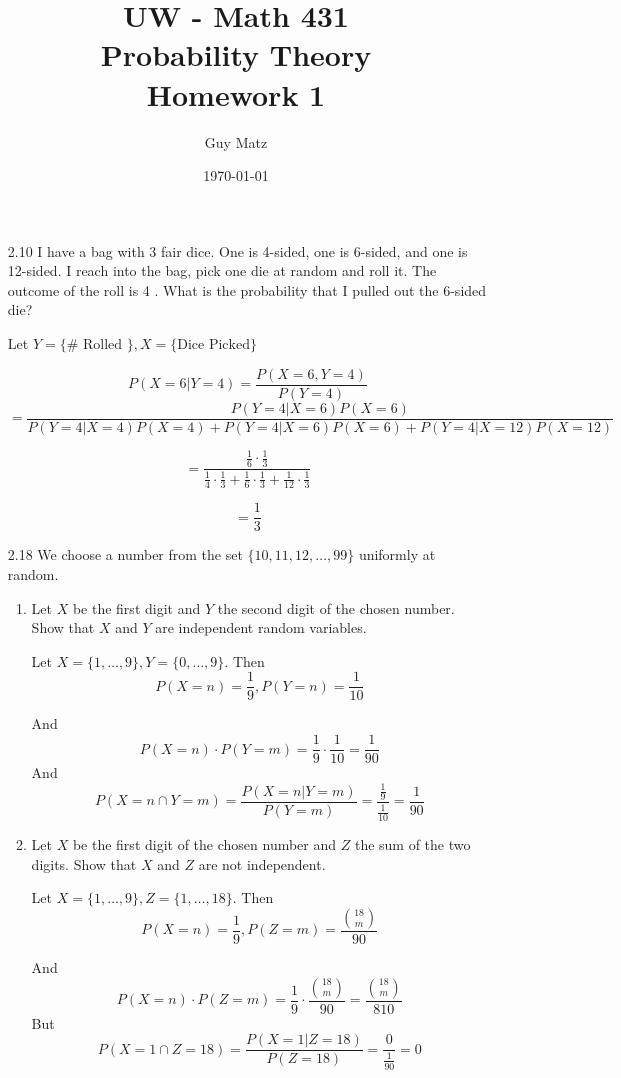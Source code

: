 \documentclass[10pt]{article}
\title{UW - Math 431 \\
Probability Theory \\
Homework 1}
\author{Guy Matz}
\date{\today}
\begin{document}
\maketitle

\begin{itemize}

  \item[2.10] I have a bag with 3 fair dice. One is 4-sided, one is 6-sided, and one is 12-sided. I reach into the bag, pick one die at random and roll it. The outcome of the roll is 4 . What is the probability that I pulled out the 6-sided die?

    Let $Y = \{\# \text{ Rolled }\}, X = \{\text{Dice Picked}\}$

    \[ P(X=6|Y=4) = \frac{P(X=6, Y=4)}{P(Y=4)} \]
    \[
      = \frac{P(Y=4|X=6)P(X=6)}{P(Y=4|X=4)P(X=4) + P(Y=4|X=6)P(X=6)
      + P(Y=4|X=12)P(X=12) } 
    \]

    \[ = \frac{\frac{1}{6} \cdot \frac{1}{3} } { \frac{1}{4} \cdot \frac{1}{3} + \frac{1}{6} \cdot \frac{1}{3} + \frac{1}{12} \cdot \frac{1}{3} }  \]

    \[ = \frac{1}{3}  \]

\newpage
  \item[2.18] We choose a number from the set $\{10,11,12, \ldots, 99\}$
    uniformly at random.

    \begin{enumerate}
      \item Let $X$ be the first digit and $Y$ the second digit of the chosen number. Show that $X$ and $Y$ are independent random variables.

    Let $X = \{1, \dots , 9\}, Y = \{0, \dots, 9\}$.  Then
    \[ P(X=n) = \frac{1}{9}, P(Y=n) = \frac{1}{10}  \]

    And 
      \[ P(X=n) \cdot P(Y=m) = \frac{1}{9} \cdot \frac{1}{10} = \frac{1}{90}  \]
    And
    \[
      P(X=n \cap Y=m) = \frac{P(X=n|Y=m)}{P(Y=m)}
    = \frac{\frac{1}{9}}{\frac{1}{10}} = \frac{1}{90}
   \]
      \item Let $X$ be the first digit of the chosen number and $Z$ the sum of the two digits. Show that $X$ and $Z$ are not independent.

    Let $X = \{1, \dots , 9\}, Z = \{1, \dots, 18\}$.  Then
    \[ P(X=n) = \frac{1}{9}, P(Z=m) = \frac{\binom{18}{m}}{90}  \]

    And 
      \[ P(X=n) \cdot P(Z=m) = \frac{1}{9} \cdot \frac{\binom{18}{m}}{90}  = \frac{\binom{18}{m}}{810}  \]
    But
    \[
      P(X=1 \cap Z=18) = \frac{P(X=1|Z=18)}{P(Z=18)}
    = \frac{0}{\frac{1}{90}} = 0
    \]
    \end{enumerate}


\end{itemize}
\end{document}

